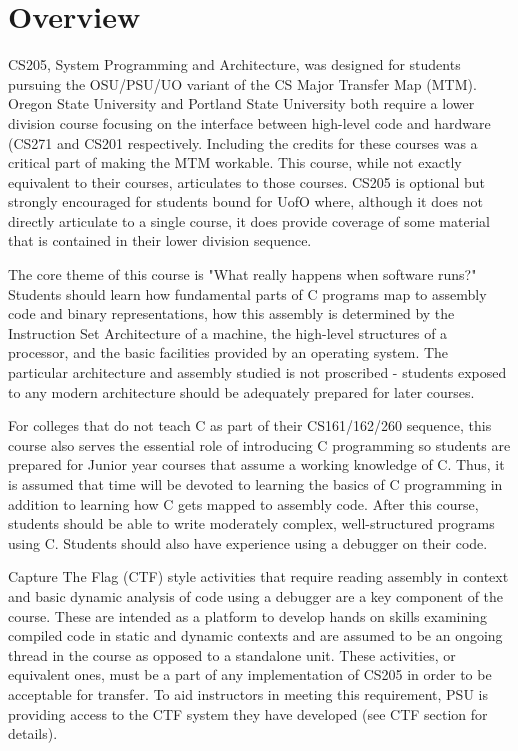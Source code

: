 \documentclass[12pt,letterpaper]{article}
\begin{document}
	\section*{Overview}

	CS205, System Programming and Architecture, was designed for students pursuing the OSU/PSU/UO variant of the CS Major Transfer Map (MTM). Oregon State University and Portland State University both require a lower division course focusing on the interface between high-level code and hardware (CS271 and CS201 respectively. Including the credits for these courses was a critical part of making the MTM workable. This course, while not exactly equivalent to their courses, articulates to those courses. CS205 is optional but strongly encouraged for students bound for UofO where, although it  does not directly articulate to a single course, it does provide coverage of some material that is contained in their lower division sequence.
	 
	The core theme of this course is "What really happens when software runs?" Students should learn how fundamental parts of C programs map to assembly code and binary representations, how this assembly is determined by the Instruction Set Architecture of a machine, the high-level structures of a processor, and the basic facilities provided by an operating system. The particular architecture and assembly studied is not proscribed - students exposed to any modern architecture should be adequately prepared for later courses.

	For colleges that do not teach C as part of their CS161/162/260 sequence, this course also serves the essential role of introducing C programming so students are prepared for Junior year courses that assume a working knowledge of C. Thus, it is assumed that time will be devoted to learning the basics of C programming in addition to learning how C gets mapped to assembly code. After this course, students should be able to write moderately complex, well-structured programs using C. Students should also have experience using a debugger on their code.
	
	Capture The Flag (CTF) style activities that require reading assembly in context and basic dynamic analysis of code using a debugger are a key component of the course. These are intended as a platform to develop hands on skills examining compiled code in static and dynamic contexts and are assumed to be an ongoing thread in the course as opposed to a standalone unit. These activities, or equivalent ones, must be a part of any implementation of CS205 in order to be acceptable for transfer. To aid instructors in meeting this requirement, PSU is providing access to the CTF system they have developed (see CTF section for details). 
	
\end{document}
